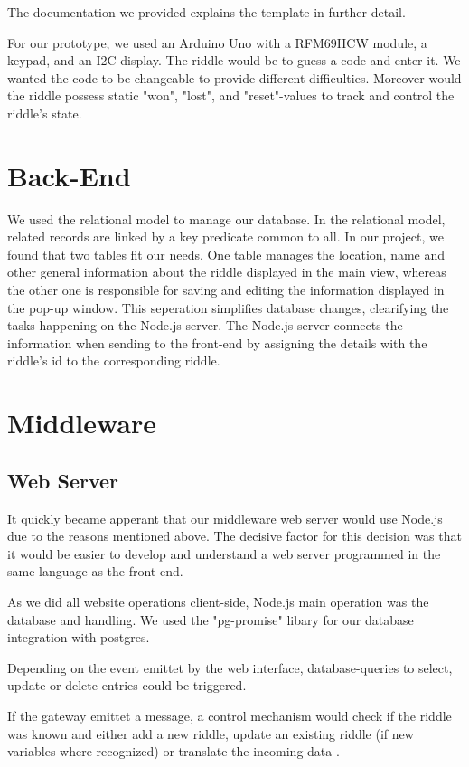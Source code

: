 The documentation we provided explains the template in further detail.

For our prototype, we used an Arduino Uno with a RFM69HCW module, a keypad, and an I2C-display. 
The riddle would be to guess a code and enter it. 
We wanted the code to be changeable to provide different difficulties. 
Moreover would the riddle possess static  "won", "lost", and "reset"-values to track and control the riddle's state.
\section{Back-End}
We used the relational model to manage our database. 
In the relational model, related records are linked by a key predicate common to all. 
In our project, we found that two tables fit our needs. 
One table manages the location, name and other general information about the riddle displayed in the main view, 
whereas the other one is responsible for saving and editing the information displayed in the pop-up window. 
This seperation simplifies database changes, clearifying the tasks happening on the Node.js server.
The Node.js server connects the information when sending to the front-end by assigning the details with the riddle's id to the corresponding riddle. 

\section{Middleware}

\subsection{Web Server}
It quickly became apperant that our middleware web server would use Node.js due to the reasons mentioned above.
The decisive factor for this decision was that it would be easier to develop and understand a web server programmed in the same language as the front-end.

As we did all website operations client-side, Node.js main operation was the database and handling. 
We used the "pg-promise" libary \parencite{pg-promise} for our database integration with postgres. 

Depending on the event emittet by the web interface, database-queries to select, update or delete entries could be triggered.

If the gateway emittet a message, a control mechanism would check if the riddle was known and either add a new riddle, update an existing riddle (if new variables where recognized) or translate the incoming data .


